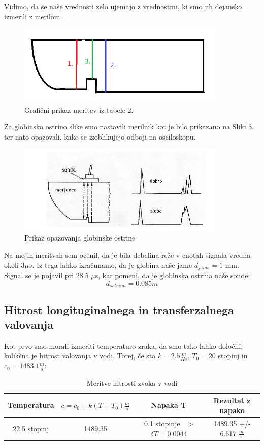 \documentclass[11pt, a4paper]{article}
\theoremstyle{definition}
\theoremstyle{example}
\theoremstyle{izrek}
\begin{document}
Vidimo, da se naše vrednosti zelo ujemajo z vrednostmi, ki smo jih dejansko izmerili z merilom. 
\begin{figure}[htp]
    \centering
    \includegraphics[width=10cm]{Slika luknje.png}
    \caption{Grafični prikaz meritev iz tabele 2. }
\end{figure}

Za globinsko ostrino slike smo nastavili merilnik kot je bilo prikazano na Sliki 3. ter nato opazovali, kako se izoblikujejo odboji na osciloskopu. 

\begin{figure}[htp]
    \centering
    \includegraphics[width=10cm]{Globinska ostrina.png}
    \caption{Prikaz opazovanja globinske ostrine }
\end{figure}

Na mojih meritvah sem ocenil, da je bila debelina reže v enotah signala vredna okoli $3 \mu s$. Iz tega lahko izračunamo, da je globina naše jame $d_{jame}=1$ mm. \\
Signal se je pojavil pri 28.5 $\mu $s, kar pomeni, da je globinska ostrina naše sonde: 
$$d_{ostrina}= 0.085 m $$

\subsection{Hitrost longituginalnega in transferzalnega valovanja}

Kot prvo smo morali izmeriti temperaturo zraka, da smo tako lahko določili, kolikšna je hitrost valovanja v vodi. 
Torej, če sta $k=2.5 \frac{m}{Ks}$, $T_0=20$ stopinj in $c_0=1483.1 \frac{m}{s}$: \\
\begin{table}[ht]
	\centering
	\begin{tabular}{|c|c|c|c|}
		\hline
		Temperatura & $c=c_0+k(T-T_0) \frac{m}{s}$ &  Napaka T & Rezultat z napako\\
		\hline
		\hline
	  	22.5 stopinj & 1489.35  & 0.1 stopinje => $\delta T=0.0044 $ & 1489.35 +/- 6.617 $\frac{m}{s}$ \\
		\hline
		\end{tabular}
		\caption{Meritve hitrosti zvoka v vodi}
		\label{tab:FirstTable}
\end{table}
\end{document}
